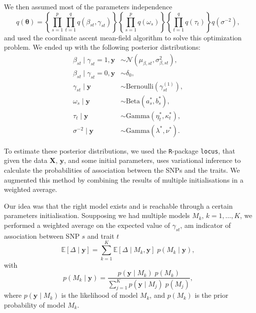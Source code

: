 \documentclass[a4paper, 11pt]{report}
\numberwithin{equation}{chapter}
\begin{document}
We then assumed most of the parameters independence
$$
q(\boldsymbol{\theta}) =\left\lbrace\prod_{s=1}^p \prod_{t=1}^q q(\beta_{st}, \gamma_{st})\right\rbrace \left\lbrace\prod_{s=1}^p  q(\omega_s)\right\rbrace \left\lbrace\prod_{t=1}^q q(\tau_t)\right\rbrace q(\sigma^{-2}),
$$
and used the coordinate ascent mean-field algorithm to solve this optimization problem. We ended up with the following posterior distributions:
\begin{align*}
\beta_{st} \mid \gamma_{st} = 1, \boldsymbol{y} &\sim \mathcal{N}\left(\mu_{\beta, st},\sigma^2_{\beta, st}\right),\\
\beta_{st} \mid \gamma_{st} = 0, \boldsymbol{y} &\sim \delta_0,\\
\gamma_{st} \mid \boldsymbol{y} &\sim \text{Bernoulli}(\gamma_{st}^{(1)}),\\
\omega_s\mid\boldsymbol{y} &\sim \text{Beta}(a_s^*,b_s^*),\\
\tau_t\mid \boldsymbol{y} &\sim \text{Gamma}(\eta^*_t, \kappa^*_t),\\
\sigma^{-2} \mid \boldsymbol{y} &\sim \text{Gamma}(\lambda^*, \nu^*).
\end{align*}

To estimate these posterior distributions, we used the \texttt{R}-package \texttt{locus}, that given the data $\boldsymbol{X}$, $\boldsymbol{y}$, and some initial parameters, uses variational inference to calculate the probabilities of association between the SNPs and the traits. We augmented this method by combining the results of multiple initialisations in a weighted average.

Our idea was that the right model exists and is reachable through a certain parameters initialisation. Soupposing we had multiple models $M_k$, $k=1, \dots, K$, we performed a weighted average on the expected value of $\gamma_{st}$, am indicator of association between SNP $s$ and trait $t$
$$
\mathbb{E}\left[\Delta \mid \boldsymbol{y}\right] = \sum_{k=1}^K\mathbb{E}\left[\Delta \mid M_k, \boldsymbol{y}\right]\;p(M_k \mid \boldsymbol{y}),
$$
with 
$$
p(M_k \mid \boldsymbol{y}) = \frac{p(\boldsymbol{y} \mid M_k)\; p(M_k)}{\sum_{j=1}^K p(\boldsymbol{y} \mid M_j)\; p(M_j)},
$$
where $p(\boldsymbol{y}\mid M_k)$ is the likelihood of model $M_k$, and $p(M_k)$ is the prior probability of model $M_k$.
\end{document}
